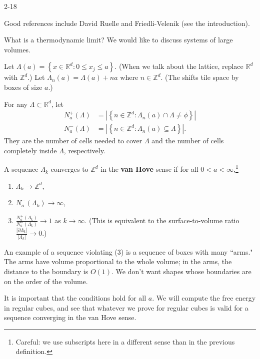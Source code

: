 {\color{blue}2-18}


Good references include David Ruelle and Friedli-Velenik (see the introduction).

What is a thermodynamic limit? We would like to discuss systems of large volumes.
\begin{definition}
Let $\Lambda(a) = \left\{{x\in \mathbb{R}^d}:{0\le x_j\le a}\right\}$. (When we talk about the lattice, replace $\mathbb{R}^d$ with $\mathbb{Z}^d$.) Let $\Lambda_n (a) = \Lambda(a)+na$ where $n\in \mathbb{Z}^d$. (The shifts tile space by boxes of size $a$.)

For any $\Lambda\subset \mathbb{R}^d$, let 
\begin{align*}
N_a^+(\Lambda) &= \left| {\left\{{n\in\mathbb{Z}^d}:{\Lambda_n(a) \cap \Lambda \ne \phi}\right\}} \right|\\
N_a^-(\Lambda)&=  \left| {\left\{{n\in\mathbb{Z}^d}:{\Lambda_n(a) \subseteq \Lambda}\right\}} \right|.
\end{align*}
They are the number of cells needed to cover $\Lambda$ and the number of cells completely inside $\Lambda$, respectively.
\end{definition}
\begin{definition}
A sequence $\Lambda_k$ converges to $\mathbb{Z}^d$ in the \textbf{van Hove} sense if for all $0<a<\infty$,\footnote{Careful: we use subscripts here in a different sense than in the previous definition.}
\begin{enumerate}
\item
$\Lambda_k\to \mathbb{Z}^d$,
\item
$N_a^-(\Lambda_k) \to \infty$,
\item
$\frac{N_a^+(\Lambda_k)}{N_a^-(\Lambda_k)}\to 1$ as $k\to \infty$. (This is equivalent to the surface-to-volume ratio $\frac{|\partial \Lambda_k|}{|\Lambda_k|}\to 0$.)
\end{enumerate}
\end{definition}
An example of a sequence violating (3) is a sequence of boxes with many ``arms." The arms have volume proportional to the whole volume; in the arms, the distance to the boundary is $O(1)$. We don't want shapes whose boundaries are on the order of the volume.

It is important that the conditions hold for all $a$. %
We will compute the free energy in regular cubes, and see that whatever we prove for regular cubes is valid for a sequence converging in the van Hove sense.

